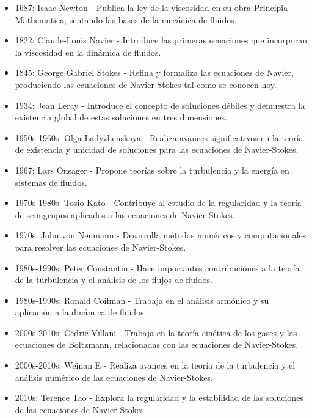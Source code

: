 \begin{itemize}
    \item 1687: Isaac Newton - Publica la ley de la viscosidad en su obra Principia Mathematica, sentando las bases de la mecánica de fluidos.
    \item 1822: Claude-Louis Navier - Introduce las primeras ecuaciones que incorporan la viscosidad en la dinámica de fluidos.
    \item 1845: George Gabriel Stokes - Refina y formaliza las ecuaciones de Navier, produciendo las ecuaciones de Navier-Stokes tal como se conocen hoy.
    \item 1934: Jean Leray - Introduce el concepto de soluciones débiles y demuestra la existencia global de estas soluciones en tres dimensiones.
    \item 1950s-1960s: Olga Ladyzhenskaya - Realiza avances significativos en la teoría de existencia y unicidad de soluciones para las ecuaciones de Navier-Stokes.
    \item 1967: Lars Onsager - Propone teorías sobre la turbulencia y la energía en sistemas de fluidos.
    \item 1970s-1980s: Tosio Kato - Contribuye al estudio de la regularidad y la teoría de semigrupos aplicados a las ecuaciones de Navier-Stokes.
    \item 1970s: John von Neumann - Desarrolla métodos numéricos y computacionales para resolver las ecuaciones de Navier-Stokes.
    \item 1980s-1990s: Peter Constantin - Hace importantes contribuciones a la teoría de la turbulencia y el análisis de los flujos de fluidos.
    \item 1980s-1990s: Ronald Coifman - Trabaja en el análisis armónico y su aplicación a la dinámica de fluidos.
    \item 2000s-2010s: Cédric Villani - Trabaja en la teoría cinética de los gases y las ecuaciones de Boltzmann, relacionadas con las ecuaciones de Navier-Stokes.
    \item 2000s-2010s: Weinan E - Realiza avances en la teoría de la turbulencia y el análisis numérico de las ecuaciones de Navier-Stokes.
    \item 2010s: Terence Tao - Explora la regularidad y la estabilidad de las soluciones de las ecuaciones de Navier-Stokes.

\end{itemize}
